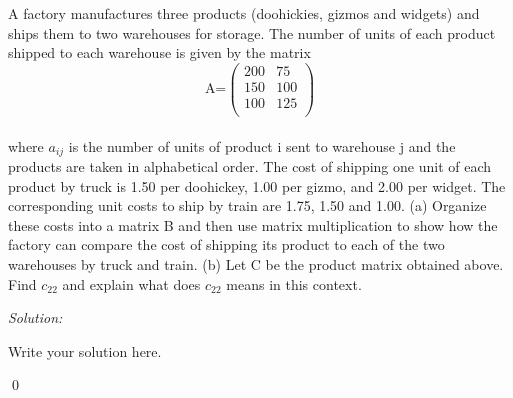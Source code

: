 \documentclass[12pt]{article}
\newenvironment{problem}[2][Problem]{\begin{trivlist}
\item[\hskip \labelsep {\bfseries #1}\hskip \labelsep {\bfseries #2.}]}{\end{trivlist}}
\newenvironment{sol}
    {\emph{Solution:}
    }
    {
    \qed
    }
\begin{document}
\begin{problem}{VII}
A factory manufactures three products (doohickies, gizmos and widgets) and ships them to two warehouses for storage. The number of units of each product shipped to each warehouse is given by the matrix
\\
$$\text{A=} \left(
\begin{array}{cc}
 200 & 75 \\
 150 & 100 \\
 100 & 125 \\
\end{array}
\right)$$
\\
where $a_{ij}$ is the number of units of product i sent to warehouse j and the products are taken in alphabetical order. The cost of shipping one unit of each product by truck is 1.50 per doohickey, 1.00 per gizmo, and 2.00 per widget. The corresponding unit costs to ship by train are 1.75, 1.50 and 1.00.
(a) Organize these costs into a matrix B and then use matrix multiplication to show how the factory can compare the cost of shipping its product to each of the two warehouses by truck and train.
(b) Let C be the product matrix obtained above. Find $c_{22}$ and explain what does $c_{22}$ means in this context.
\end{problem}
\begin{sol}
Write your solution here.
\end{sol}
\end{document}
